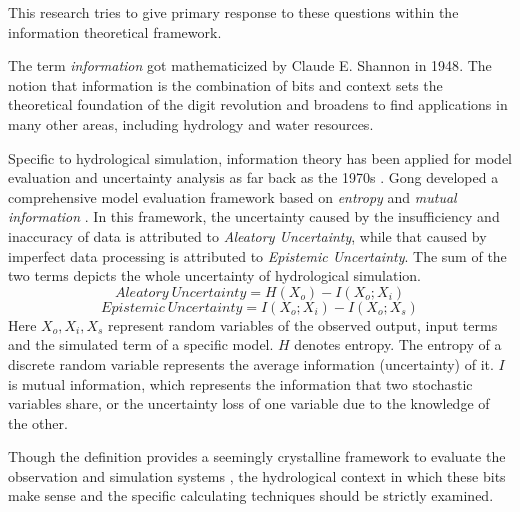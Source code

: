 \documentclass[11pt]{article}
\begin{document}
This research tries to give primary response to these questions within the information theoretical framework.



The term \emph{information} got mathematicized  by Claude E. Shannon in 1948\cite{shannon2001mathematical}. The notion that information is the combination of bits and context\cite{bryant2003computer} sets the theoretical foundation of the digit revolution and   broadens to find applications in many other areas, including hydrology and water resources\cite{singh1997use,singh2000entropy,singh2013entropy}. 
 
Specific to hydrological simulation,
information theory has been applied for model evaluation and
uncertainty analysis as far back as the 1970s \cite{amorocho1973entropy,chapman1986entropy,abebe2003managing,pokhrel2010use,weijs2010hydrological,weijs2011accounting}
.
Gong developed a comprehensive model evaluation framework based on \emph{entropy} and \emph{mutual information} \cite{gong2013estimating} . In this framework, the uncertainty caused by the insufficiency and inaccuracy of data is attributed to \emph{Aleatory Uncertainty}, while that caused by imperfect data processing is attributed to \emph{Epistemic Uncertainty}. The sum of the two terms depicts the whole uncertainty of hydrological simulation.
\begin{equation}\label{AU}
Aleatory~Uncertainty= H(X_{o})-I(X_{o};X_{i})
\end{equation}
\begin{equation}\label{EU}
Epistemic~Uncertainty=I(X_{o};X_{i})-I(X_{o};X_{s})
\end{equation}
Here $X_o,X_i,X_s$ represent random variables of the observed output, input terms and the simulated term of a specific model. $H$ denotes entropy. The entropy of a discrete random variable represents the average information (uncertainty) of it. $I$ is  mutual information, which represents the  information that two stochastic variables share, or the uncertainty loss of one variable due to the knowledge of the other.  

Though the definition provides a seemingly crystalline framework to evaluate the observation and simulation systems , the hydrological context in which these bits make sense and the specific calculating techniques should be strictly examined. 
\end{document}

